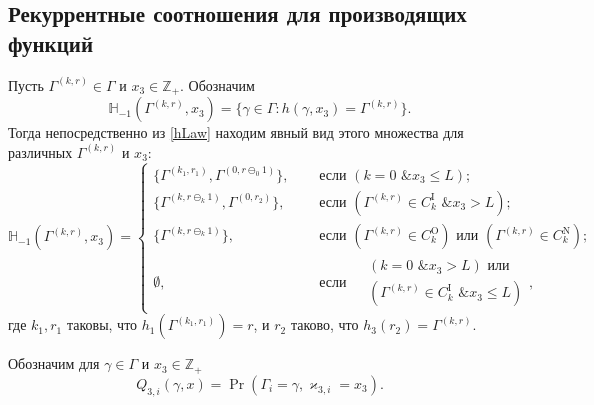 \documentclass[a4paper,12pt,russian]{extarticle}
\begin{document}
\subsection[Рекуррентные соотношения для производящих функций]%
{Рекуррентные соотношения для производящих функций}
Пусть $\Gamma^{(k,r)}\in \Gamma$ и $x_3 \in {\mathbb Z}_+$. Обозначим 
\begin{equation*}
{\mathbb H}_{-1}(\Gamma^{(k,r)}, x_3) = \{\gamma \in \Gamma \colon h(\gamma, x_3) = \Gamma^{(k,r)}\}.
\end{equation*}
Тогда непосредственно из \eqref{hLaw} находим явный вид этого множества для различных $\Gamma^{(k,r)}$ и $x_3$:
\begin{equation}
{\mathbb H}_{-1}(\Gamma^{(k,r)}, x_3) = 
\begin{cases}
\{\Gamma^{(k_1,r_1)}, \Gamma^{(0,r\ominus_0 1)}\},& \quad \text{ если } (k=0\text{ \& } x_3 \leqslant L);\\
\{\Gamma^{(k,r\ominus_k 1)}, \Gamma^{(0,r_2)}\},& \quad \text{ если } (\Gamma^{(k,r)}\in C_k^{\mathrm{I}} \text{ \& } x_3>L);\\ 
\{\Gamma^{(k,r\ominus_k 1)}\},& \quad \text{ если } (\Gamma^{(k,r)}\in C_k^{\mathrm{O}}) \text{ или } (\Gamma^{(k,r)}\in C_k^{\mathrm{N}});\\
\emptyset,& \quad \text{ если }
\begin{aligned} 
&(k = 0 \text{ \& } x_3>L) \text{ или } \\ & (\Gamma^{(k,r)}\in C_k^{\mathrm{I}} \text{ \& } x_3\leqslant L)
\end{aligned},
\end{cases}
\end{equation}
где $k_1,r_1$ таковы, что $h_1(\Gamma^{(k_1,r_1)})=r$, и $r_2$ таково, что $h_3(r_2)=\Gamma^{(k,r)}$.

Обозначим для $\gamma \in \Gamma$ и $x_3 \in {\mathbb Z}_+$
\begin{equation}
Q_{3,i}(\gamma,x) = \Pr(\Gamma_{i}=\gamma, \varkappa_{3,i}=x_3).
\end{equation}
\end{document}
